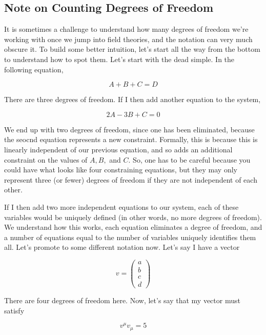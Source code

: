 \documentclass{article}
\begin{document}
\subsection{Note on Counting Degrees of Freedom}
It is sometimes a challenge to understand how many degrees of freedom we're working with once we jump into field theories, and the notation can very much obscure it. To build some better intuition, let's start all the way from the bottom to understand how to spot them. Let's start with the dead simple. In the following equation,

\begin{equation}
    A + B + C = D
\end{equation}

There are three degrees of freedom. If I then add another equation to the system,

\begin{equation}
    2A - 3B + C = 0
\end{equation}

We end up with two degrees of freedom, since one has been eliminated, because the seocnd equation represents a new constraint. Formally, this is because this is linearly independent of our previous equation, and so adds an additional constraint on the values of $A, B,$ and $C$. So, one has to be careful because you could have what looks like four constraining equations, but they may only represent three (or fewer) degrees of freedom if they are not independent of each other.

If I then add two more independent equations to our system, each of these variables would be uniquely defined (in other words, no more degrees of freedom). We understand how this works, each equation eliminates a degree of freedom, and a number of equations equal to the number of variables uniquely identifies them all. Let's promote to some different notation now. Let's say I have a vector

\begin{equation}
    v = \begin{pmatrix} a \\ b \\ c \\ d \end{pmatrix}
\end{equation}

There are four degrees of freedom here. Now, let's say that my vector must satisfy

\begin{equation}
    v^\mu v_\mu = 5
\end{equation}
\end{document}

